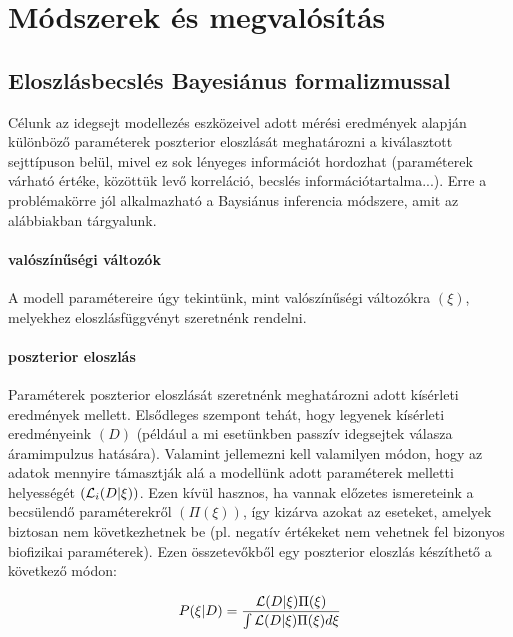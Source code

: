 

\section{Módszerek és megvalósítás}
\subsection{Eloszlásbecslés Bayesiánus formalizmussal}\label{sec:bayes}
Célunk az idegsejt modellezés eszközeivel adott mérési eredmények alapján különböző paraméterek poszterior eloszlását meghatározni a kiválasztott sejttípuson belül, mivel ez sok lényeges információt hordozhat (paraméterek várható értéke, közöttük levő korreláció, becslés információtartalma...). Erre a problémakörre jól alkalmazható a Baysiánus inferencia módszere, amit az alábbiakban tárgyalunk.

\paragraph{valószínűségi változók}
A modell paramétereire úgy tekintünk, mint valószínűségi változókra $(\xi)$, melyekhez eloszlásfüggvényt szeretnénk rendelni.

\paragraph{poszterior eloszlás}
Paraméterek poszterior eloszlását szeretnénk meghatározni adott kísérleti eredmények mellett.
Elsődleges szempont tehát, hogy legyenek kísérleti eredményeink $(D)$ (például a mi esetünkben passzív idegsejtek válasza áramimpulzus hatására). Valamint jellemezni kell valamilyen módon, hogy az adatok mennyire támasztják alá a modellünk adott paraméterek melletti helyességét $(\mathcal{L}_i(D|\xi))$. Ezen kívül hasznos, ha vannak előzetes ismereteink a becsülendő paraméterekről $(\Pi(\xi))$, így kizárva azokat az eseteket, amelyek biztosan nem következhetnek be (pl. negatív értékeket nem vehetnek fel bizonyos biofizikai paraméterek). Ezen összetevőkből egy poszterior eloszlás készíthető a következő módon:

\begin{equation}\label{eq:bayes}
P(\xi|D) = \dfrac{\mathcal{L}(D|\xi)\Pi(\xi)}{\int \mathcal{L}(D|\xi)\Pi(\xi)d\xi}
\end{equation}

